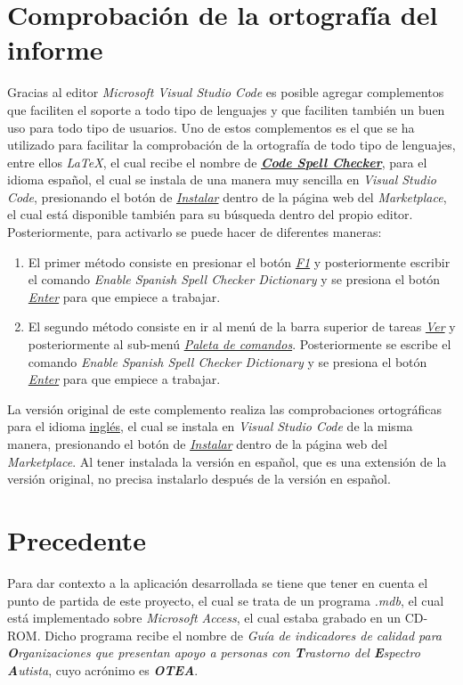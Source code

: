     \section{Comprobación de la ortografía del informe}
    Gracias al editor \textit{Microsoft Visual Studio Code} es posible agregar complementos que faciliten el soporte a todo tipo de lenguajes y que faciliten también un buen uso para todo tipo de usuarios. Uno de estos complementos es 
    el que se ha utilizado para facilitar la comprobación de la ortografía de todo tipo de lenguajes, entre ellos \textit{LaTeX}, el cual recibe el nombre de \color{blue}\href{https://marketplace.visualstudio.com/items?itemName=streetsidesoftware.code-spell-checker-spanish}{\textbf{\textit{Code Spell Checker}}}\color{black}, 
    para el idioma español, el cual se instala de una manera muy sencilla en \textit{Visual Studio Code}, presionando el botón de \textit{\underline{Instalar}} dentro de la página web del \textit{Marketplace}, el cual está disponible también para su búsqueda dentro del propio editor. 
    Posteriormente, para activarlo se puede hacer de diferentes maneras:
    \begin{enumerate}
        \item El primer método consiste en presionar el botón \textit{\underline{F1}} y posteriormente escribir el comando \textit{Enable Spanish Spell Checker Dictionary} y se presiona el botón \textit{\underline{Enter}} para que empiece a trabajar.
        \item El segundo método consiste en ir al menú de la barra superior de tareas \textit{\underline{Ver}} y posteriormente al sub-menú \textit{\underline{Paleta de comandos}}. Posteriormente se escribe el comando \textit{Enable Spanish Spell Checker Dictionary} y 
        se presiona el botón \textit{\underline{Enter}} para que empiece a trabajar.
    \end{enumerate}
    La versión original de este complemento realiza las comprobaciones ortográficas para el idioma \color{blue}\href{https://marketplace.visualstudio.com/items?itemName=streetsidesoftware.code-spell-checker}{inglés}\color{black}, el cual se instala en \textit{Visual Studio Code} de la misma manera, presionando el botón de \textit{\underline{Instalar}} dentro de la página web del \textit{Marketplace}.
    Al tener instalada la versión en español, que es una extensión de la versión original, no precisa instalarlo después de la versión en español.


\section{Precedente}
Para dar contexto a la aplicación desarrollada se tiene que tener en cuenta el punto de partida de este proyecto, el cual se trata de un programa \textit{.mdb}, el cual 
está implementado sobre \textit{Microsoft Access}, el cual estaba grabado en un CD-ROM. Dicho programa recibe el nombre de \textit{Guía de indicadores de calidad para \textbf{O}rganizaciones que presentan apoyo a personas con \textbf{T}rastorno del \textbf{E}spectro \textbf{A}utista}, cuyo acrónimo es \textbf{\textit{OTEA}}.
